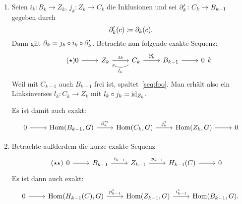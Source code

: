 
\begin{vorbereitung}
  \begin{enumerate}
    \item
      Seien $i_k \colon B_k \to Z_k$, $j_k \colon Z_k \to C_k$ die Inklusionen und sei $\partial_k'\colon C_k \to B_{k-1}$ gegeben durch
      \begin{equation*}
        \partial_k'(c) \coloneqq \partial_k(c).
      \end{equation*}
      Dann gilt $\partial_k = j_k \circ i_k \circ \partial_k'$.
      Betrachte nun folgende exakte Sequenz:
      \begin{equation}
        \begin{tikzcd}
          \tag{$\star$}
          \label{seq:foo}
          0 \arrow{r}{} & Z_k \arrow{r}{j_k}
          & C_k \arrow[bend left]{l}{l_k}
          \arrow{r}{\del_k'}
          & B_{k-1} \arrow{r}{}
          & 0
        \end{tikzcd}k
      \end{equation}
      Weil mit $C_{k-1}$ auch $B_{k-1}$ frei ist, spaltet~\eqref{seq:foo}.
      Man erhält also ein Linksinverses $l_k \colon C_k \to Z_k$ mit $l_k \circ j_k = \operatorname{id}_{Z_k}$.

      Es ist damit auch exakt:
      \begin{equation*}
        \begin{tikzcd}
          0 \arrow{r}{}
          & \Hom(B_{k-1},G) \arrow{r}{\del_k'^*}
          & \Hom(C_k,G) \arrow{r}{j_k^*}
          & \Hom(Z_k,G) \arrow{r}{}
          & 0
        \end{tikzcd}
      \end{equation*}
    \item
      Betrachte außderdem die kurze exakte Sequenz
      \begin{equation}
        \tag{$\star\star$}
        \label{seq:bar}
        \begin{tikzcd}
          0 \arrow{r}{}
          & B_{k-1} \arrow{r}{i_{k-1}}
          & Z_{k-1} \arrow{r}{p_{k-1}}
          & H_{k-1}(C) \arrow{r}{}
          & 0
        \end{tikzcd}
      \end{equation}
      Es ist dann auch exakt:
      \begin{equation*}
        \begin{tikzcd}
          0 \arrow{r}{}
          & \Hom(H_{k-1}(C),G) \arrow{r}{p_{k-1}^*}
          & \Hom(Z_{k-1},G) \arrow{r}{i_{k-1}^*}
          & \Hom(B_{k-1},G).
        \end{tikzcd}
      \end{equation*}
  \end{enumerate}
\end{vorbereitung}

